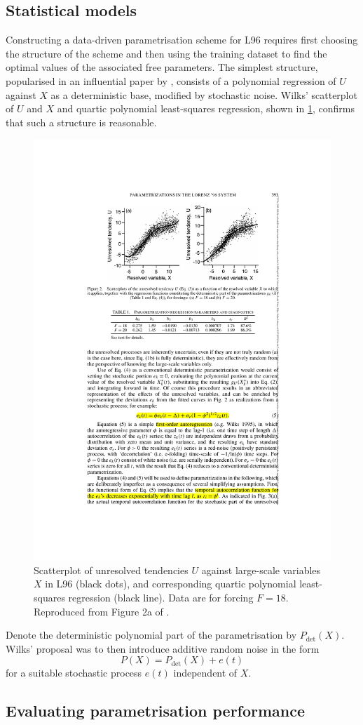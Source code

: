 \documentclass[titlepage,twoside]{article}
\numberwithin{equation}{section}
\begin{document}
\subsection{Statistical models}
Constructing a data-driven parametrisation scheme for L96 requires first
choosing the structure of the scheme and then using the training dataset to
find the optimal values of the associated free parameters. The simplest
structure, popularised in an influential paper by \textcite{wilks2005},
consists of a polynomial regression of $U$ against $X$ as a deterministic base,
modified by stochastic noise. Wilks' scatterplot of $U$ and $X$ and quartic
polynomial least-squares regression, shown in \cref{fig:wilks2005_regression},
confirms that such a structure is reasonable.

\begin{figure}[ht]
    \centering
    \includegraphics[width=0.3\linewidth]{figures/wilks2005_regression.pdf}
    \caption{
        Scatterplot of unresolved tendencies $U$ against large-scale variables
        $X$ in L96 (black dots), and corresponding quartic polynomial
        least-squares regression (black line). Data are for forcing $F=18$.
        Reproduced from Figure 2a of \textcite{wilks2005}.
    }
    \label{fig:wilks2005_regression}
\end{figure}

Denote the deterministic polynomial part of the parametrisation by
$P_\mathrm{det}(X)$. Wilks' proposal was to then introduce additive random
noise in the form
\begin{equation*}
    P(X) = P_\mathrm{det}(X) + e(t)
\end{equation*}
for a suitable stochastic process $e(t)$ independent of $X$.


\subsection{Evaluating parametrisation performance}
\end{document}
